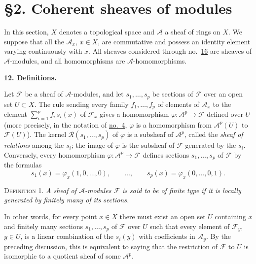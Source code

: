\label{fac:I:2}
\section*{\S2. Coherent sheaves of modules}

In this section, $X$ denotes a topological space and $\mathcal{A}$ a sheaf of rings on $X$. We suppose that all the $\mathcal{A}_x$, $x\in X$, are commutative and possess an identity element varying continuously with $x$. All sheaves considered through no.~\hyperref[fac:I:2:no:16]{16} are sheaves of $\mathcal{A}$-modules, and all homomorphisms are $\mathcal{A}$-homomorphisms.

\medskip
{}\label{fac:I:2:no:12}
\textbf{12. Definitions.}

Let $\mathcal{F}$ be a sheaf of $\mathcal{A}$-modules, and let $s_1,\ldots,s_p$ be sections of $\mathcal{F}$ over an open set $U\subset X$. The rule sending every family $f_1,\ldots,f_p$ of elements of $\mathcal{A}_x$ to the element $\sum_{i=1}^{p}f_i\,s_i(x)$ of $\mathcal{F}_x$ gives a homomorphism $\varphi:\mathcal{A}^p\to\mathcal{F}$ defined over $U$ (more precisely, in the notation of \hyperref[fac:I:1:no:4]{no.~4}, $\varphi$ is a homomorphism from $\mathcal{A}^p(U)$ to $\mathcal{F}(U)$). The kernel $\mathcal{R}(s_1,\ldots,s_p)$ of $\varphi$ is a subsheaf of $\mathcal{A}^p$, called the \textit{sheaf of relations} among the $s_i$; the image of $\varphi$ is the subsheaf of $\mathcal{F}$ generated by the $s_i$. Conversely, every homomorphism $\varphi:\mathcal{A}^p\to\mathcal{F}$ defines sections $s_1,\ldots,s_p$ of $\mathcal{F}$ by the formulas
\[
s_1(x)=\varphi_x(1,0,\ldots,0),\qquad\ldots,\qquad
s_p(x)=\varphi_x(0,\ldots,0,1).
\]

\label{fac:I:2:no:12:def:1}
\textsc{Definition 1.} \textit{A sheaf of $\mathcal{A}$-modules $\mathcal{F}$ is said to be of finite type if it is locally generated by finitely many of its sections.}

In other words, for every point $x\in X$ there must exist an open set $U$ containing $x$ and finitely many sections $s_1,\ldots,s_p$ of $\mathcal{F}$ over $U$ such that every element of $\mathcal{F}_y$, $y\in U$, is a linear combination of the $s_i(y)$ with coefficients in $\mathcal{A}_y$. By the preceding discussion, this is equivalent to saying that the restriction of $\mathcal{F}$ to $U$ is isomorphic to a quotient sheaf of some $\mathcal{A}^p$.

